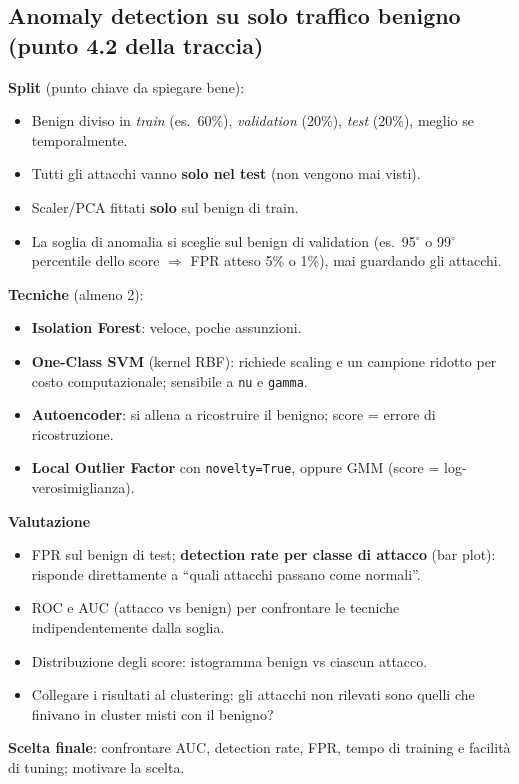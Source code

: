 \subsection{Anomaly detection su solo traffico benigno (punto 4.2 della traccia)}
\begin{strategia}
\textbf{Split} (punto chiave da spiegare bene):
\begin{itemize}
  \item Benign diviso in \emph{train} (es.\ 60\%), \emph{validation} (20\%),
        \emph{test} (20\%), meglio se temporalmente.
  \item Tutti gli attacchi vanno \textbf{solo nel test} (non vengono mai visti).
  \item Scaler/PCA fittati \textbf{solo} sul benign di train.
  \item La soglia di anomalia si sceglie sul benign di validation (es.\ 95$^\circ$
        o 99$^\circ$ percentile dello score $\Rightarrow$ FPR atteso 5\% o 1\%),
        mai guardando gli attacchi.
\end{itemize}

\textbf{Tecniche} (almeno 2):
\begin{itemize}
  \item \textbf{Isolation Forest}: veloce, poche assunzioni.
  \item \textbf{One-Class SVM} (kernel RBF): richiede scaling e un campione
        ridotto per costo computazionale; sensibile a \texttt{nu} e
        \texttt{gamma}.
  \item \textbf{Autoencoder}: si allena a ricostruire il benigno; score =
        errore di ricostruzione.
  \item \textbf{Local Outlier Factor} con \texttt{novelty=True}, oppure
        GMM (score = log-verosimiglianza).
\end{itemize}

\textbf{Valutazione}
\begin{itemize}
  \item FPR sul benign di test; \textbf{detection rate per classe di
        attacco} (bar plot): risponde direttamente a ``quali attacchi
        passano come normali''.
  \item ROC e AUC (attacco vs benign) per confrontare le tecniche
        indipendentemente dalla soglia.
  \item Distribuzione degli score: istogramma benign vs ciascun attacco.
  \item Collegare i risultati al clustering: gli attacchi non rilevati sono
        quelli che finivano in cluster misti con il benigno?
\end{itemize}

\textbf{Scelta finale}: confrontare AUC, detection rate, FPR, tempo di training
e facilità di tuning; motivare la scelta.
\end{strategia}

